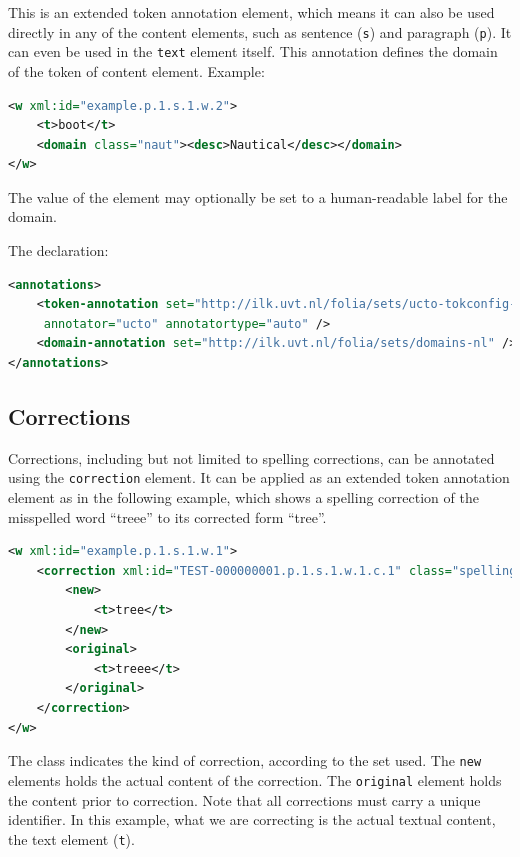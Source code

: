 \documentclass[a4paper,12pt]{report}
\begin{document}
This is an extended token annotation element, which means it can also be used directly in any of the content elements, such as sentence (\texttt{s}) and  paragraph (\texttt{p}). It can even be used in the \texttt{text} element itself. This annotation defines the domain of the token of content element. Example:

\begin{lstlisting}[language=xml]
<w xml:id="example.p.1.s.1.w.2">
    <t>boot</t>
    <domain class="naut"><desc>Nautical</desc></domain>
</w>
\end{lstlisting}

The value of the element may optionally be set to a human-readable label for the domain.

The declaration:

\begin{lstlisting}[language=xml]
<annotations>
    <token-annotation set="http://ilk.uvt.nl/folia/sets/ucto-tokconfig-nl"
     annotator="ucto" annotatortype="auto" />
    <domain-annotation set="http://ilk.uvt.nl/folia/sets/domains-nl" />
</annotations>
\end{lstlisting}

\subsection{Corrections}

Corrections, including but not limited to spelling corrections, can be annotated using the \texttt{correction} element. It can be applied as an extended token annotation element as in the following example, which shows a spelling correction of the misspelled word ``treee'' to its corrected form ``tree''.

\begin{lstlisting}[language=xml]
<w xml:id="example.p.1.s.1.w.1">
    <correction xml:id="TEST-000000001.p.1.s.1.w.1.c.1" class="spelling">
        <new>
            <t>tree</t>
        </new>
        <original>
            <t>treee</t>
        </original>
    </correction>
</w>
\end{lstlisting}

The class indicates the kind of correction, according to the set used. The \texttt{new} elements holds the actual content of the correction. The \texttt{original} element holds the content prior to correction. Note that all corrections must carry a unique identifier. In this example, what we are correcting is the actual textual content, the text element (\texttt{t}).
\end{document}
